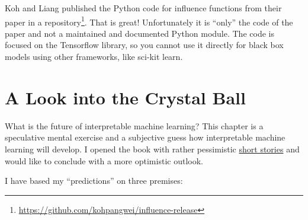 \documentclass[
  10pt,
]{scrbook}
\renewcommand{\href}[2]{#2\footnote{\url{#1}}}
\begin{document}
Koh and Liang published the Python code for influence functions from their paper \href{https://github.com/kohpangwei/influence-release}{in a repository}.
That is great!
Unfortunately it is ``only'' the code of the paper and not a maintained and documented Python module.
The code is focused on the Tensorflow library, so you cannot use it directly for black box models using other frameworks, like sci-kit learn.

\hypertarget{future}{%
\chapter{A Look into the Crystal Ball}\label{future}}

What is the future of interpretable machine learning?
This chapter is a speculative mental exercise and a subjective guess how interpretable machine learning will develop.
I opened the book with rather pessimistic \protect\hyperlink{storytime}{short stories} and would like to conclude with a more optimistic outlook.

I have based my ``predictions'' on three premises:
\end{document}
